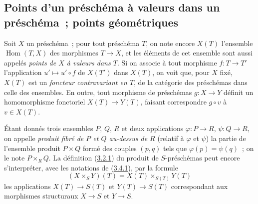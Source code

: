 \subsection{Points d'un préschéma à valeurs dans un préschéma~; points
géométriques}
\label{subsection:I.3.4-fr}

\begin{env}[3.4.1]
\label{I.3.4.1-fr}
Soit $X$ un préschéma~; pour tout préschéma $T$, on note encore $X(T)$
l'ensemble $\operatorname{Hom}(T,X)$ des morphismes $T\to X$, et les éléments de cet ensemble
sont aussi appelés \emph{points de $X$ à valeurs dans $T$}. Si on associe à
tout morphisme $f:T\to T'$ l'application $u'\mapsto u'\circ f$ de $X(T')$ dans
$X(T)$, on voit que, pour $X$ fixé, $X(T)$ est un \emph{foncteur contravariant
en $T$}, de la catégorie des préschémas dans celle des ensembles. En outre,
tout morphisme de préschémas $g:X\to Y$ définit un homomorphisme fonctoriel
$X(T)\to Y(T)$, faisant correspondre $g\circ v$ à $v\in X(T)$.
\end{env}

\begin{env}[3.4.2]
\label{I.3.4.2-fr}
Étant donnés trois ensembles $P$, $Q$, $R$ et deux applications
$\varphi:P\to R$, $\psi:Q\to R$, on appelle \emph{produit fibré de $P$ et $Q$
au-dessus de $R$} (relatif à $\varphi$ et $\psi$) la partie de
l'ensemble produit $P\times Q$ formé des couples $(p,q)$ tels que
$\varphi(p)=\psi(q)$~; on le note $P\times_R Q$. La définition
(\hyperref[I.3.2.1-fr]{3.2.1}) du produit de $S$-préschémas peut encore
s'interpréter, avec les notations de (\hyperref[I.3.4.1-fr]{3.4.1}), par la
formule
\label{I.3.4.2.1-fr}
\[
  (X\times_S Y)(T)=X(T)\times_{S(T)}Y(T)
  \tag{3.4.2.1}
\]
les applications $X(T)\to S(T)$ et $Y(T)\to S(T)$ correspondant aux morphismes
structuraux $X\to S$ et $Y\to S$.
\end{env}

